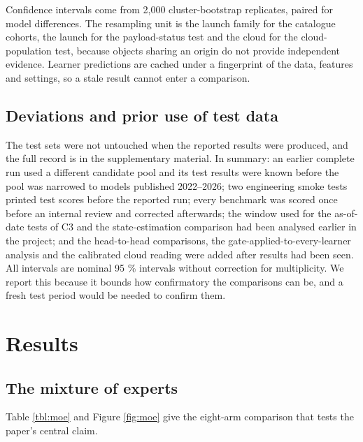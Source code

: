 \documentclass[3p,times,twocolumn]{elsarticle}
\begin{document}
Confidence intervals come from 2,000 cluster-bootstrap replicates,
paired for model differences. The resampling unit is the launch family
for the catalogue cohorts, the launch for the payload-status test and
the cloud for the cloud-population test, because objects sharing an
origin do not provide independent evidence. Learner predictions are
cached under a fingerprint of the data, features and settings, so a
stale result cannot enter a comparison.

\subsection{Deviations and prior use of test
data}\label{deviations-and-prior-use-of-test-data}

The test sets were not untouched when the reported results were
produced, and the full record is in the supplementary material. In
summary: an earlier complete run used a different candidate pool and its
test results were known before the pool was narrowed to models published
2022--2026; two engineering smoke tests printed test scores before the
reported run; every benchmark was scored once before an internal review
and corrected afterwards; the window used for the as-of-date tests of C3
and the state-estimation comparison had been analysed earlier in the
project; and the head-to-head comparisons, the
gate-applied-to-every-learner analysis and the calibrated cloud reading
were added after results had been seen. All intervals are nominal 95 \%
intervals without correction for multiplicity. We report this because it
bounds how confirmatory the comparisons can be, and a fresh test period
would be needed to confirm them.

\section{Results}\label{sec:results}

\subsection{The mixture of experts}\label{the-mixture-of-experts}

Table \ref{tbl:moe} and Figure \ref{fig:moe} give the eight-arm
comparison that tests the paper's central claim.
\end{document}
